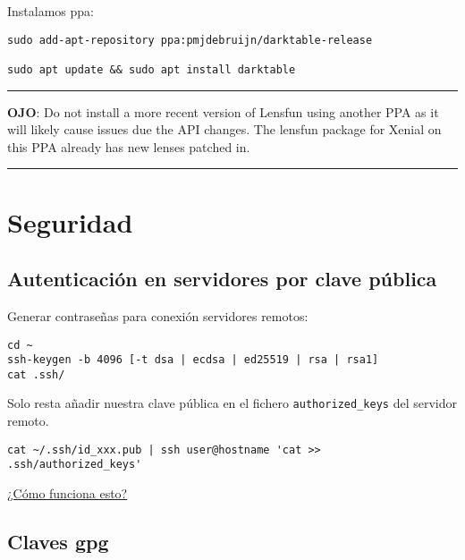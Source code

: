 \documentclass[
  12pt,
  spanish,
]{article}
\begin{document}
Instalamos ppa:

\begin{verbatim}
sudo add-apt-repository ppa:pmjdebruijn/darktable-release

sudo apt update && sudo apt install darktable
\end{verbatim}

\begin{center}\rule{0.5\linewidth}{\linethickness}\end{center}

\textbf{OJO}: Do not install a more recent version of Lensfun using
another PPA as it will likely cause issues due the API changes. The
lensfun package for Xenial on this PPA already has new lenses patched
in.

\begin{center}\rule{0.5\linewidth}{\linethickness}\end{center}

\hypertarget{seguridad}{%
\section{Seguridad}\label{seguridad}}

\hypertarget{autenticaciuxf3n-en-servidores-por-clave-puxfablica}{%
\subsection{Autenticación en servidores por clave
pública}\label{autenticaciuxf3n-en-servidores-por-clave-puxfablica}}

Generar contraseñas para conexión servidores remotos:

\begin{verbatim}
cd ~
ssh-keygen -b 4096 [-t dsa | ecdsa | ed25519 | rsa | rsa1]
cat .ssh/
\end{verbatim}

Solo resta añadir nuestra clave pública en el fichero
\texttt{authorized\_keys} del servidor remoto.

\begin{verbatim}
cat ~/.ssh/id_xxx.pub | ssh user@hostname 'cat >> .ssh/authorized_keys'
\end{verbatim}

\href{https://www.digitalocean.com/community/tutorials/understanding-the-ssh-encryption-and-connection-process}{¿Cómo
funciona esto?}

\hypertarget{claves-gpg}{%
\subsection{Claves gpg}\label{claves-gpg}}
\end{document}
